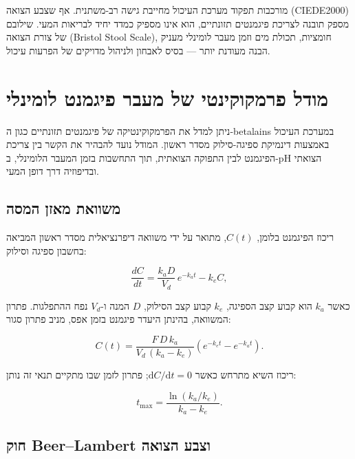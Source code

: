 \begin{hebrew}מורכבות תפקוד מערכת העיכול מחייבת גישה רב-משתנית. אף שצבע הצואה (\textenglish{CIEDE2000}) מספק תובנה לצריכת פיגמנטים תזונתיים, הוא אינו מספיק כמדד יחיד לבריאות המעי. שילובם של צורת הצואה (\textenglish{Bristol Stool Scale}), חומציות, תכולת מים וזמן מעבר לומינלי מעניק הבנה מעודנת יותר — בסיס לאבחון ולניהול מדויקים של הפרעות עיכול.\end{hebrew}

\section{\texthebrew{מודל פרמקוקינטי של מעבר פיגמנט לומינלי}}

\begin{hebrew}ניתן למדל את הפרמקוקינטיקה של פיגמנטים תזונתיים כגון ה-\textenglish{betalains} במערכת העיכול באמצעות דינמיקת ספיגה-סילוק מסדר ראשון. המודל נועד להבהיר את הקשר בין צריכת הפיגמנט לבין התפוקה הצואתית, תוך התחשבות בזמן המעבר הלומינלי, ב-\textenglish{pH} הצואתי ובדיפוזיה דרך דופן המעי.\end{hebrew}

\subsection{\texthebrew{משוואת מאזן המסה}}

\begin{hebrew}ריכוז הפיגמנט בלומן, $C(t)$, מתואר על ידי משוואה דיפרנציאלית מסדר ראשון המביאה בחשבון ספיגה וסילוק:\end{hebrew}

$$\frac{dC}{dt} = \frac{k_a D}{V_d}\,e^{-k_a t} - k_e C,$$

\begin{hebrew}כאשר $k_a$ הוא קבוע קצב הספיגה, $k_e$ קבוע קצב הסילוק, $D$ המנה ו-$V_d$ נפח ההתפלגות. פתרון המשוואה, בהינתן היעדר פיגמנט בזמן אפס, מניב פתרון סגור:\end{hebrew}

$$C(t) = \frac{F\,D\,k_a}{V_d\,(k_a - k_e)}\left(e^{-k_e t} - e^{-k_a t}\right).$$

\begin{hebrew}ריכוז השיא מתרחש כאשר $\mathrm{d}C/\mathrm{d}t = 0$; פתרון לזמן שבו מתקיים תנאי זה נותן:\end{hebrew}

$$t_{\max} = \frac{\ln(k_a/k_e)}{k_a - k_e}.$$

\subsection{\texthebrew{חוק \textenglish{Beer--Lambert} וצבע הצואה}}


